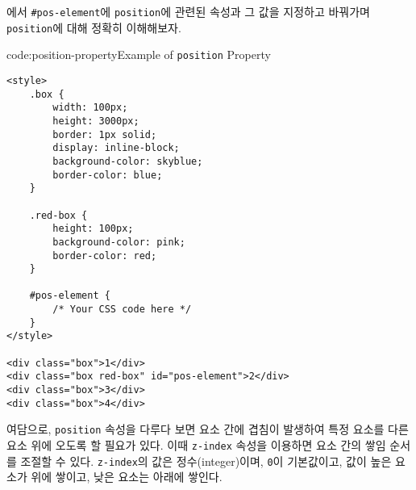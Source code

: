  에서 \texttt{\#pos-element}에 \texttt{position}에 관련된 속성과 그 값을 지정하고 바꿔가며 \texttt{position}에 대해 정확히 이해해보자.

\begin{codeenv}{code:position-property}{Example of \texttt{position} Property}\begin{verbatim}
<style>
    .box {
        width: 100px;
        height: 3000px;
        border: 1px solid;
        display: inline-block;
        background-color: skyblue;
        border-color: blue;
    }

    .red-box {
        height: 100px;
        background-color: pink;
        border-color: red;
    }

    #pos-element {
        /* Your CSS code here */
    }
</style>

<div class="box">1</div>
<div class="box red-box" id="pos-element">2</div>
<div class="box">3</div>
<div class="box">4</div>
\end{verbatim}
\end{codeenv}

여담으로, \texttt{position} 속성을 다루다 보면 요소 간에 겹침이 발생하여 특정 요소를 다른 요소 위에 오도록 할 필요가 있다. 이때 \texttt{z-index} 속성을 이용하면 요소 간의 쌓임 순서를 조절할 수 있다. \texttt{z-index}의 값은 정수(integer)이며, \texttt{0}이 기본값이고, 값이 높은 요소가 위에 쌓이고, 낮은 요소는 아래에 쌓인다. 
